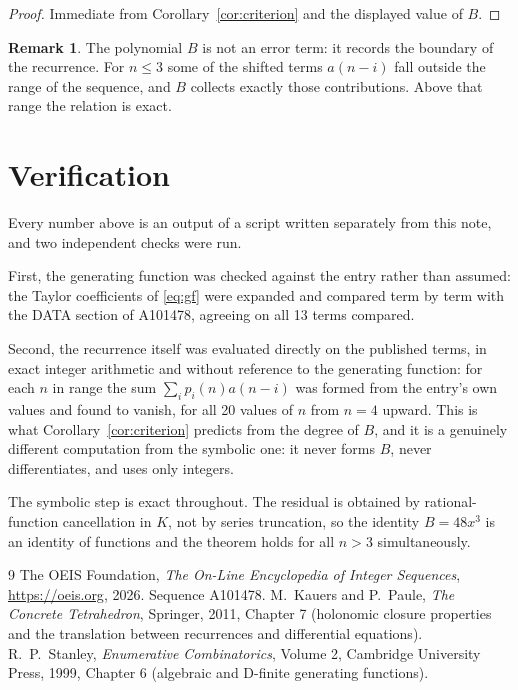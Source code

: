 \documentclass[11pt,a4paper]{article}
\theoremstyle{plain}
\theoremstyle{definition}
\newtheorem{remark}[theorem]{Remark}
\begin{document}
\begin{proof}
Immediate from Corollary~\ref{cor:criterion} and the displayed value of $B$.
\end{proof}

\begin{remark}
The polynomial $B$ is not an error term: it records the boundary of the recurrence. For
$n\le3$ some of the shifted terms $a(n-i)$ fall outside the range of the sequence,
and $B$ collects exactly those contributions. Above that range the relation is exact.
\end{remark}

\section{Verification}

Every number above is an output of a script written separately from this note, and two
independent checks were run.

First, the generating function was checked against the entry rather than assumed: the
Taylor coefficients of \eqref{eq:gf} were expanded and compared term by term with the DATA
section of A101478, agreeing on all 13 terms compared.

Second, the recurrence itself was evaluated directly on the published terms, in exact
integer arithmetic and without reference to the generating function: for each $n$ in range
the sum $\sum_{i}p_{i}(n)a(n-i)$ was formed from the entry's own values and found to
vanish, for all 20 values of $n$ from $n=4$ upward. This is what
Corollary~\ref{cor:criterion} predicts from the degree of $B$, and it is a genuinely
different computation from the symbolic one: it never forms $B$, never differentiates, and
uses only integers.

The symbolic step is exact throughout. The residual is obtained by rational-function
cancellation in $K$, not by series truncation, so the identity $B=48 x^{3}$ is an
identity of functions and the theorem holds for all $n>3$ simultaneously.

\begin{thebibliography}{9}
 The OEIS Foundation, \emph{The On-Line Encyclopedia of Integer Sequences},
\url{https://oeis.org}, 2026. Sequence A101478.
 M.~Kauers and P.~Paule, \emph{The Concrete Tetrahedron}, Springer, 2011,
Chapter 7 (holonomic closure properties and the translation between recurrences and
differential equations).
 R.~P.~Stanley, \emph{Enumerative Combinatorics}, Volume 2, Cambridge
University Press, 1999, Chapter 6 (algebraic and D-finite generating functions).
\end{thebibliography}
\end{document}

